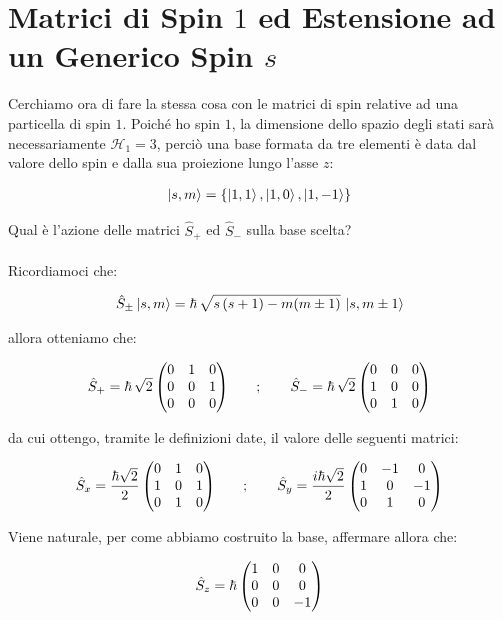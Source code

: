 \section{Matrici di Spin $1$ ed Estensione ad un Generico Spin $s$}
	
	Cerchiamo ora di fare la stessa cosa con le matrici di spin relative ad una particella di spin $1$. Poiché ho spin $1$, la dimensione dello spazio degli stati sarà necessariamente $\mathcal{H}_1 = 3$, perciò una base formata da tre elementi è data dal valore dello spin e dalla sua proiezione lungo l'asse $z$:
	
\begin{align*}
	\ket{s, m} = \qty{\ket{1, 1}, \ket{1, 0}, \ket{1, -1} }
\end{align*}

	Qual è l'azione delle matrici $\hat{S}_+$ ed $\hat{S}_-$ sulla base scelta?
	\\
	\\
	Ricordiamoci che:
	
\begin{align*}
	\hat{S}_{\pm} \ket{s, m} = \hbar \, \sqrt{s \, \qty(s + 1) - m \qty(m \pm 1)} \, \ket{s, m \pm 1}
\end{align*}

	allora otteniamo che:

\begin{align*}
	\hat{S}_+ = \hbar \, \sqrt{2} \, \mqty( 0 & 1 & 0 \\ 0 & 0 & 1 \\ 0 & 0 & 0) \qquad ; \qquad \hat{S}_- = \hbar \, \sqrt{2} \, \mqty( 0 & 0 & 0 \\ 1 & 0 & 0 \\ 0 & 1 & 0) 
\end{align*}

	da cui ottengo, tramite le definizioni date, il valore delle seguenti matrici:
	
\begin{align*}	
	\hat{S}_x = \frac{\hbar \sqrt{2}}{2} \, \mqty( 0 & 1 & 0 \\ 1 & 0 & 1 \\ 0 & 1 & 0) \qquad ; \qquad \hat{S}_y = \frac{i\hbar \sqrt{2}}{2} \, \mqty( 0 & -1 & 0 \\ 1 & 0 & -1 \\ 0 & 1 & 0)
\end{align*}

	Viene naturale, per come abbiamo costruito la base, affermare allora che:
	
\begin{align*}
	\hat{S}_z = \hbar \, \mqty( 1 & 0 & 0 \\ 0 & 0 & 0 \\ 0 & 0 & -1)
\end{align*}

